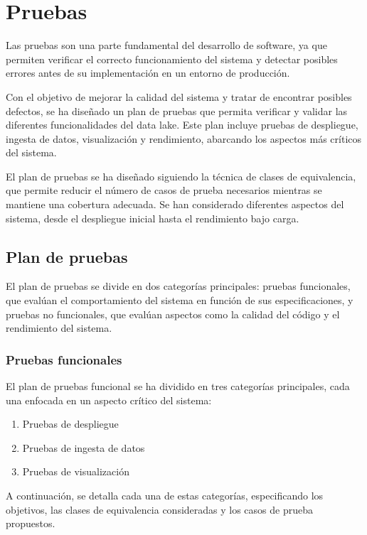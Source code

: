 \chapter{Pruebas}
Las pruebas son una parte fundamental del desarrollo de software, ya que
permiten verificar el correcto funcionamiento del sistema y detectar posibles
errores antes de su implementación en un entorno de producción.

Con el objetivo de mejorar la calidad del sistema y tratar de encontrar posibles
defectos, se ha diseñado un plan de pruebas que permita verificar y
validar las diferentes funcionalidades del data lake. Este plan incluye pruebas
de despliegue, ingesta de datos, visualización y rendimiento, abarcando los
aspectos más críticos del sistema.

El plan de pruebas se ha diseñado siguiendo la técnica de clases de
equivalencia, que permite reducir el número de casos de prueba necesarios
mientras se mantiene una cobertura adecuada. Se han considerado diferentes
aspectos del sistema, desde el despliegue inicial hasta el rendimiento bajo
carga.


\newpage{}
\section{Plan de pruebas}
El plan de pruebas se divide en dos categorías principales: pruebas funcionales,
que evalúan el comportamiento del sistema en función de sus especificaciones,
y pruebas no funcionales, que evalúan aspectos como la calidad del código y el
rendimiento del sistema.


\subsection{Pruebas funcionales}
El plan de pruebas funcional se ha dividido en tres categorías principales,
cada una enfocada en un aspecto crítico del sistema:

\begin{enumerate}
    \item Pruebas de despliegue
    \item Pruebas de ingesta de datos
    \item Pruebas de visualización
\end{enumerate}

A continuación, se detalla cada una de estas categorías, especificando los
objetivos, las clases de equivalencia consideradas y los casos de prueba
propuestos.


